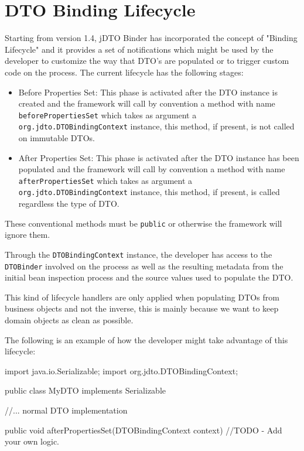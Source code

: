 \documentclass[11pt]{article}
\newcommand{\JDTO}{jDTO Binder\xspace}
\begin{document}
\section{DTO Binding Lifecycle}

Starting from version 1.4, \JDTO has incorporated the concept of "Binding Lifecycle" and it provides a set of notifications which might be used by the developer to customize the way that DTO's are populated or to trigger custom code on the process. The current lifecycle has the following stages:

\begin{itemize}

\item Before Properties Set: This phase is activated after the DTO instance is created and the framework will call by convention a method with name \texttt{beforePropertiesSet} which takes as argument a \texttt{org.jdto.DTOBindingContext} instance, this method, if present, is not called on immutable DTOs.

\item After Properties Set: This phase is activated after the DTO instance has been populated and the framework will call by convention a method with name \texttt{afterPropertiesSet} which takes as argument a \texttt{org.jdto.DTOBindingContext} instance, this method, if present, is called regardless the type of DTO.

\end{itemize}

These conventional methods must be \texttt{public} or otherwise the framework will ignore them.

Through the \texttt{DTOBindingContext} instance, the developer has access to the \texttt{DTOBinder} involved on the process as well as the resulting metadata from the initial bean inspection process and the source values used to populate the DTO.

This kind of lifecycle handlers are only applied when populating DTOs from business objects and not the inverse, this is mainly because we want to keep domain objects as clean as possible.

The following is an example of how the developer might take advantage of this lifecycle:

\begin{java}
import java.io.Serializable;
import org.jdto.DTOBindingContext;

public class MyDTO implements Serializable {
    
    //... normal DTO implementation
	
    public void afterPropertiesSet(DTOBindingContext context) {
        //TODO - Add your own logic.
    }
}

\end{java}
\end{document}
